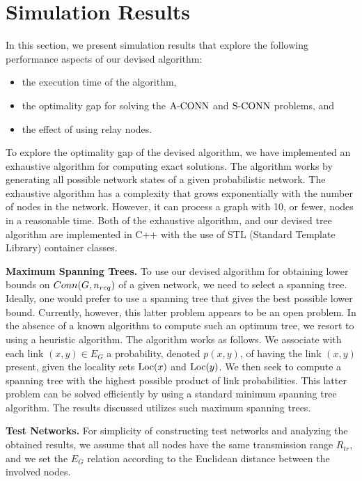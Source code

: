 
\section{Simulation Results}

In this section, we present simulation results that explore
the following performance aspects of our devised algorithm:
%
\begin{itemize}
\item  the execution time of the algorithm,
\item  the optimality gap for solving the ${\mathrm {A\mbox{-}CONN}}$ and ${\mathrm {S\mbox{-}CONN}}$ problems, and
\item  the effect of using relay nodes.
\end{itemize}

To explore the optimality gap of the devised algorithm, we have implemented
an exhaustive algorithm for computing exact solutions.
%
The algorithm works by generating all possible network states
of a given probabilistic network.
%
The exhaustive algorithm has a complexity that grows exponentially with
the number of nodes in the network. However, it can process a graph
with 10, or fewer, nodes in a reasonable time.
%
Both of the exhaustive algorithm, and our devised tree algorithm
are implemented in C++ with the use of STL (Standard Template Library)
container classes.


\nwline
{\bf Maximum Spanning Trees.}
To use our devised algorithm for obtaining lower bounds on $Conn(G,{n_{req}})$
of a given network, we need to select a spanning tree.
%
Ideally, one would prefer to use a spanning tree that gives the best
possible lower bound.
%
Currently, however, this latter problem appears to be an open problem.
%
In the absence of a known algorithm to compute such an optimum tree,
we resort to using a heuristic algorithm.
%
The algorithm works as follows.
%
We associate with each link $(x,y) \in E_G$ a probability, denoted $p(x,y)$,
of having the link $(x,y)$ present, given the locality sets ${\mathrm {Loc}}(x)$ and
${\mathrm {Loc}}(y)$.
%
We then seek to compute a spanning tree with the highest possible
product of link probabilities.
%
This latter problem can be solved efficiently by using a standard minimum
spanning tree algorithm.
%
The results discussed utilizes such maximum spanning trees.


\nwline
{\bf Test Networks.}
%
For simplicity of constructing test networks and analyzing the obtained
results, we assume that all nodes have the same transmission range
$R_{tr}$, and we set the $E_G$ relation according to the Euclidean
distance between the involved nodes.

